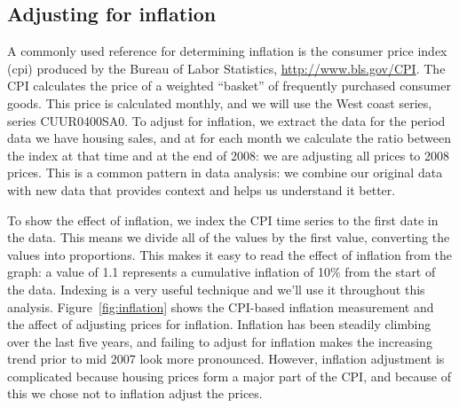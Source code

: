 \documentclass[oneside]{article}
\begin{document}
\subsection{Adjusting for inflation}

A commonly used reference for determining inflation is the consumer price index ({\sc cpi}) produced by the Bureau of Labor Statistics, \url{http://www.bls.gov/CPI}.  The {\sc CPI} calculates the price of a weighted ``basket'' of frequently purchased consumer goods.  This price is calculated monthly, and we will use the West coast series, series CUUR0400SA0.
To adjust for inflation, we extract the data for the period data we have housing sales, and at for each month we calculate the ratio between the index at that time and at the end of 2008: we are adjusting all prices to 2008 prices. This is a common pattern in data analysis: we combine our original data with new data that provides context and helps us understand it better.  

% 

To show the effect of inflation, we index the CPI time series to the first date in the data.  This means we divide all of the values by the first value, converting the values into proportions.  This makes it easy to read the effect of inflation from the graph: a value of 1.1 represents a cumulative inflation of 10\% from the start of the data.  Indexing is a very useful technique and we'll use it throughout this analysis.  Figure~\ref{fig:inflation} shows the CPI-based inflation measurement and the affect of adjusting prices for inflation.  Inflation has been steadily climbing over the last five years, and failing to adjust for inflation makes the increasing trend prior to mid 2007 look more pronounced.  However, inflation adjustment is complicated because housing prices form a major part of the CPI, and because of this we chose not to inflation adjust the prices.
\end{document}
